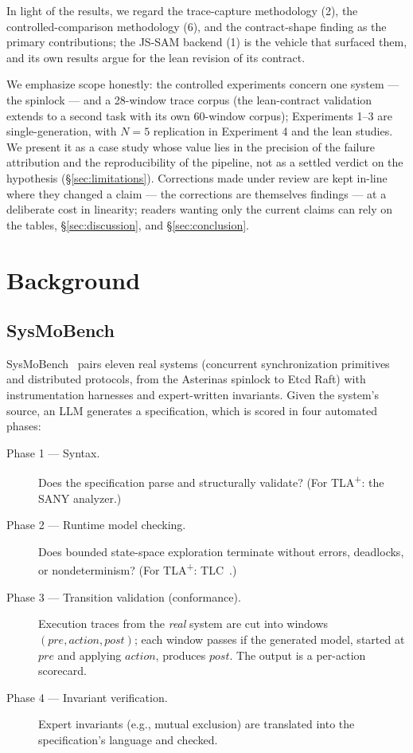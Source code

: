 \documentclass[11pt]{article}
\newcommand{\jssam}{JS-SAM}
\newcommand{\tlaplus}{TLA\texorpdfstring{\textsuperscript{+}}{+}}
\begin{document}
In light of the results, we regard the trace-capture methodology (2), the
controlled-comparison methodology (6), and the contract-shape finding as the
primary contributions; the \jssam{} backend (1) is the vehicle that surfaced
them, and its own results argue for the lean revision of its contract.

We emphasize scope honestly: the controlled experiments concern one system
--- the spinlock --- and a 28-window trace corpus (the lean-contract
validation extends to a second task with its own 60-window corpus);
Experiments 1--3 are single-generation, with $N{=}5$ replication in
Experiment 4 and the lean studies. We present it as a case study whose
value lies in the precision of the failure attribution and the reproducibility
of the pipeline, not as a settled verdict on the hypothesis
(\S\ref{sec:limitations}). Corrections made under review are kept in-line
where they changed a claim --- the corrections are themselves findings ---
at a deliberate cost in linearity; readers wanting only the current claims
can rely on the tables, \S\ref{sec:discussion}, and \S\ref{sec:conclusion}.

\section{Background}
\label{sec:background}

\subsection{SysMoBench}

SysMoBench~\cite{sysmobench} pairs eleven real systems (concurrent
synchronization primitives and distributed protocols, from the Asterinas
spinlock to Etcd Raft) with instrumentation harnesses and expert-written
invariants. Given the system's source, an LLM generates a specification, which
is scored in four automated phases:

\begin{description}
\item[Phase 1 --- Syntax.] Does the specification parse and structurally
  validate? (For \tlaplus{}: the SANY analyzer.)
\item[Phase 2 --- Runtime model checking.] Does bounded state-space
  exploration terminate without errors, deadlocks, or nondeterminism? (For
  \tlaplus{}: TLC~\cite{yu1999tlc}.)
\item[Phase 3 --- Transition validation (conformance).] Execution traces from
  the \emph{real} system are cut into windows
  $(\mathit{pre}, \mathit{action}, \mathit{post})$; each window passes if the
  generated model, started at $\mathit{pre}$ and applying $\mathit{action}$,
  produces $\mathit{post}$. The output is a per-action scorecard.
\item[Phase 4 --- Invariant verification.] Expert invariants (e.g., mutual
  exclusion) are translated into the specification's language and checked.
\end{description}
\end{document}
